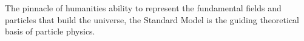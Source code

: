 The pinnacle of humanities ability to represent the fundamental fields and
particles that build the universe, the Standard Model is the guiding theoretical
basis of particle physics.



